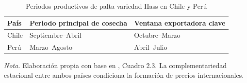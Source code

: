 \begin{table}[H]
\centering
\caption{Periodos productivos de palta variedad Hass en Chile y Per\'u}
\label{tab:periodos_hass}
\small
\begin{tabular}{lll}
\toprule
\textbf{Pa\'is} & \textbf{Periodo principal de cosecha} & \textbf{Ventana exportadora clave} \\
\midrule
Chile & Septiembre--Abril & Octubre--Marzo \\
Per\'u & Marzo--Agosto & Abril--Julio \\
\bottomrule
\end{tabular}
\parbox{0.94\textwidth}{\small \textit{Nota.} Elaboraci\'on propia con base en \citep{Trincado2022}, Cuadro 2.3. La complementariedad estacional entre ambos pa\'ises condiciona la formaci\'on de precios internacionales.}
\end{table}
